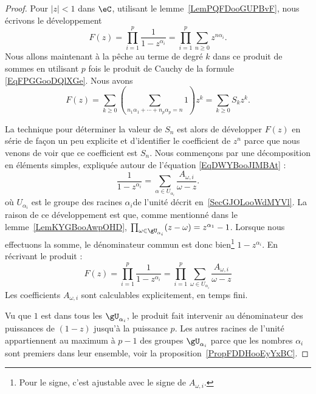 \begin{proof}
    Pour \( | z |<1\) dans \( \eC\), utilisant le lemme~\ref{LemPQFDooGUPBvF}, nous écrivons le développement
    \begin{equation}
        F(z)=\prod_{i=1}^p\frac{1}{ 1-z^{\alpha_i} }=\prod_{i=1}^p\sum_{n\geq 0}z^{n\alpha_i}.
    \end{equation}
    Nous allons maintenant à la pêche au terme de degré \( k\) dans ce produit de sommes en utilisant \( p\) fois le produit de Cauchy de la formule \eqref{EqFPGGooDQlXGe}. Nous avons
    \begin{equation}
        F(z)=\sum_{k\geq 0}\left( \sum_{n_1\alpha_1+\cdots +n_p\alpha_p=n}1 \right)z^k=\sum_{k\geq 0}S_kz^k.
    \end{equation}

    La technique pour déterminer la valeur de \( S_n\) est alors de développer \( F(z)\) en série de façon un peu explicite et d'identifier le coefficient de \( z^n\) parce que nous venons de voir que ce coefficient est \( S_n\). Nous commençons par une décomposition en éléments simples, expliquée autour de l'équation \eqref{EqDWYBooJIMBAt} :
    \begin{equation}
        \frac{1}{ 1-z^{\alpha_i} }=\sum_{\alpha\in U_{\alpha_i}}\frac{ A_{\omega,i} }{ \omega-z }.
    \end{equation}
    où \( U_{\alpha_i}\) est le groupe des racines \( \alpha_i\)\ieme de l'unité décrit en~\ref{SecGJOLooWdMYVl}. La raison de ce développement est que, comme mentionné dans le lemme~\ref{LemKYGBooAwpOHD}, \( \prod_{\omega\in\gU_{\alpha_i}}(z-\omega)=z^{\alpha_1}-1\). Lorsque nous effectuons la somme, le dénominateur commun est donc bien\footnote{Pour le signe, c'est ajustable avec le signe de \( A_{\omega,i}\).} \( 1-z^{\alpha_i}\).
    En récrivant le produit :
    \begin{equation}
        F(z)=\prod_{i=1}^{p}\frac{1}{ 1-z^{\alpha_i} }=\prod_{i=1}^p\sum_{\omega\in U_{\alpha_i}}\frac{ A_{\omega,i} }{ \omega-z }
    \end{equation}
    Les coefficients \( A_{\omega,i}\) sont calculables explicitement, en temps fini.

    Vu que \( 1\) est dans tous les \( \gU_{\alpha_i}\), le produit fait intervenir au dénominateur des puissances de \( (1-z)\) jusqu'à la puissance \( p\). Les autres racines de l'unité appartiennent au maximum à \( p-1\) des groupes \( \gU_{\alpha_i}\) parce que les nombres \( \alpha_i\) sont premiers dans leur ensemble, voir la proposition~\ref{PropFDDHooEyYxBC}.


\end{proof}
